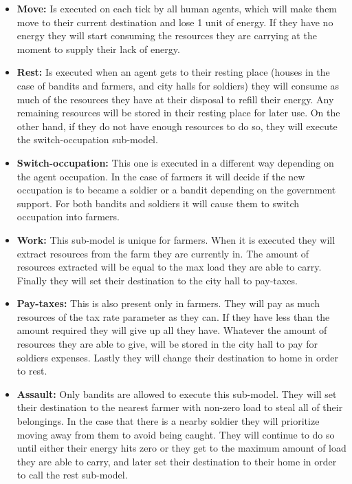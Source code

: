 \documentclass{wscpaperproc}
\begin{document}
\begin{itemize}
    \item \textbf{Move:} Is executed on each tick by all human agents, which
    will make them move to their current destination and lose 1 unit of energy.
    If they have no energy they will start consuming the resources they are
    carrying at the moment to supply their lack of energy.

    \item \textbf{Rest:} Is executed when an agent gets to
    their resting place (houses in the case of bandits and farmers, and city
    halls for soldiers) they will consume as much of the resources they
    have at their disposal to refill their energy. Any remaining resources will
    be stored in their resting place for later use. On the other hand, if they
    do not have enough resources to do so, they will execute the
    switch-occupation sub-model.

    \item \textbf{Switch-occupation:} This one is executed in a different way
    depending on the agent occupation. In the case of farmers it will decide if
    the new occupation is to became a soldier or a bandit depending on the
    government support. For both bandits and soldiers it will cause them to
    switch occupation into farmers.

    \item \textbf{Work:} This sub-model is unique for farmers. When it is
    executed they will extract resources from the farm they are currently in.
    The amount of resources extracted will be equal to the max load they are
    able to carry. Finally they will set their destination to the city hall to
    pay-taxes.

    \item \textbf{Pay-taxes:} This is also present only in farmers.
    They will pay as much resources of the tax rate parameter as they can. If
    they have less than the amount required they will give up all they
    have. Whatever the amount of resources they are able to give, will be stored
    in the city hall to pay for soldiers expenses. Lastly they will change
    their destination to home in order to rest.

    \item \textbf{Assault:} Only bandits are allowed to execute this sub-model.
    They will set their destination to the nearest farmer with non-zero load to
    steal all of their belongings. In the case that there is a nearby soldier
    they will prioritize moving away from them to avoid being caught. They
    will continue to do so until either their energy hits zero or they get to the
    maximum amount of load they are able to carry, and later set their destination
    to their home in order to call the rest sub-model.


\end{itemize}
\end{document}
